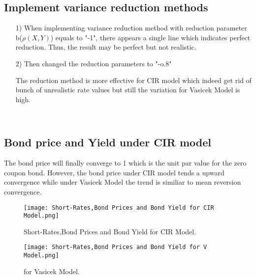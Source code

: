 \documentclass[14pt]{extarticle}
\begin{document}
\subsection{Implement variance reduction methods}
\begin{itemize}
    \item [1)]When implementing variance reduction method with reduction parameter b($ \rho(X,Y)$) equals to "-1", there appears a single line which indicates perfect reduction. Thus, the result may be perfect but not realistic.
 \begin{figure}[H]
\centering

\end{figure}   

\end{itemize}

\begin{itemize}
    \item [2)]Then changed the reduction parameters to "-o.8"
 \begin{figure}[H]
\centering

\end{figure}   
The reduction method is more effective for CIR model which indeed get rid of bunch of unrealistic rate values but still the variation for Vasicek Model is high.
\end{itemize}

~\\

\subsection{Bond price and Yield under CIR model}
The bond price will finally converge to 1 which is the unit par value for the zero coupon bond. However, the bond price under CIR model tends a upward convergence while under Vasicek Model the trend is similiar to mean reversion convergence.




\begin{figure}[H]
	\begin{minipage}[t]{0.5\textwidth}
		\centering
		\texttt{[image: Short-Rates,Bond Prices and Bond Yield for CIR Model.png]}
		\caption{Short-Rates,Bond Prices and Bond Yield for CIR Model.}
	\end{minipage}
	\qquad
	\begin{minipage}[t]{0.5\textwidth}
		\centering
		\texttt{[image: Short-Rates,Bond Prices and Bond Yield for V Model.png]}
		\caption{ for Vasicek Model.}
	\end{minipage}
\end{figure}
\end{document}

